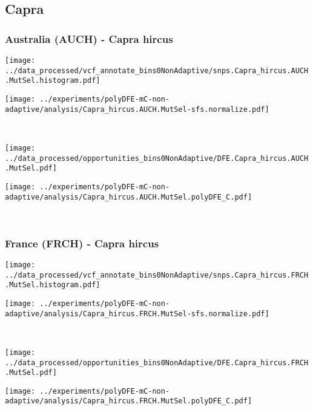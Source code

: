 \subsection{Capra}

\subsubsection{Australia (AUCH) - Capra hircus}

\begin{minipage}{0.49\linewidth}
    \texttt{[image: ../data\_processed/vcf\_annotate\_bins0NonAdaptive/snps.Capra\_hircus.AUCH.MutSel.histogram.pdf]}
\end{minipage}
\begin{minipage}{0.49\linewidth}
    \texttt{[image: ../experiments/polyDFE-mC-non-adaptive/analysis/Capra\_hircus.AUCH.MutSel-sfs.normalize.pdf]}
\end{minipage}
\\
\begin{minipage}{0.49\linewidth}
    \texttt{[image: ../data\_processed/opportunities\_bins0NonAdaptive/DFE.Capra\_hircus.AUCH.MutSel.pdf]}
\end{minipage}
\begin{minipage}{0.49\linewidth}
    \texttt{[image: ../experiments/polyDFE-mC-non-adaptive/analysis/Capra\_hircus.AUCH.MutSel.polyDFE\_C.pdf]}
\end{minipage}
\\

\subsubsection{France (FRCH) - Capra hircus}

\begin{minipage}{0.49\linewidth}
    \texttt{[image: ../data\_processed/vcf\_annotate\_bins0NonAdaptive/snps.Capra\_hircus.FRCH.MutSel.histogram.pdf]}
\end{minipage}
\begin{minipage}{0.49\linewidth}
    \texttt{[image: ../experiments/polyDFE-mC-non-adaptive/analysis/Capra\_hircus.FRCH.MutSel-sfs.normalize.pdf]}
\end{minipage}
\\
\begin{minipage}{0.49\linewidth}
    \texttt{[image: ../data\_processed/opportunities\_bins0NonAdaptive/DFE.Capra\_hircus.FRCH.MutSel.pdf]}
\end{minipage}
\begin{minipage}{0.49\linewidth}
    \texttt{[image: ../experiments/polyDFE-mC-non-adaptive/analysis/Capra\_hircus.FRCH.MutSel.polyDFE\_C.pdf]}
\end{minipage}
\\

